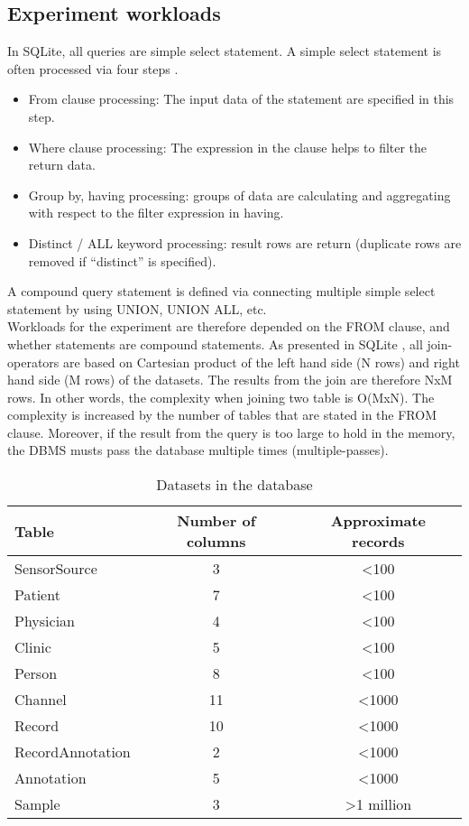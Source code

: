 \subsection{Experiment workloads}
In SQLite, all queries are simple select statement. A simple select statement is often processed via four steps \citep{SQLITE_SELECT}.
\begin{itemize}
\item From clause processing: The input data of the statement are specified in this step.
\item Where clause processing: The expression in the clause helps to filter the return data.
\item Group by, having processing: groups of data are calculating and aggregating with respect to the filter expression in having.
\item Distinct / ALL keyword processing: result rows are return (duplicate rows are removed if “distinct” is specified).
\end{itemize}
A compound query statement is defined via connecting multiple simple select statement by using UNION, UNION ALL, etc.\\
Workloads for the experiment are therefore depended on the FROM clause, and whether statements are compound statements. As presented in SQLite \citep{SQLITE_SELECT}, all join-operators are based on Cartesian product of the left hand side (N rows) and right hand side (M rows) of the datasets. The results from the join are therefore NxM rows. In other words, the complexity when joining two table is O(MxN). The complexity is increased by the number of tables that are stated in the FROM clause. Moreover, if the result from the query is too large to hold in the memory, the DBMS musts pass the database multiple times (multiple-passes).\\
\begin{table}
\centering
\begin{tabular}{|l|c|c|}
\hline
Table & Number of columns & Approximate records \\ \hline
SensorSource & 3 & \textless100 \\ \hline
Patient & 7 & \textless100 \\ \hline
Physician & 4 & \textless100 \\ \hline
Clinic & 5 & \textless100 \\ \hline
Person & 8 & \textless100 \\ \hline
Channel & 11 & \textless1000 \\ \hline
Record & 10 & \textless1000 \\ \hline
RecordAnnotation & 2 & \textless1000 \\ \hline
Annotation & 5 & \textless1000 \\ \hline
Sample & 3 & \textgreater 1 million \\ \hline
\end{tabular}
\caption{Datasets in the database}
\label{tab:dataSETs}
\end{table}
